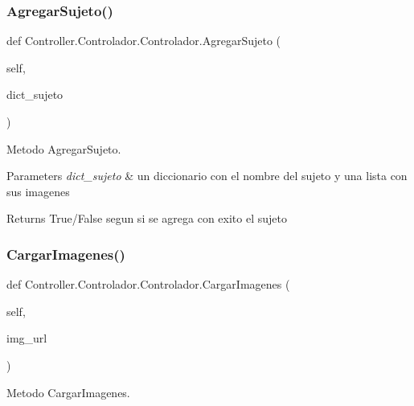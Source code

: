 \subsubsection{\texorpdfstring{Agregar\+Sujeto()}{AgregarSujeto()}}
{\footnotesize\ttfamily def Controller.\+Controlador.\+Controlador.\+Agregar\+Sujeto (\begin{DoxyParamCaption}\item[{}]{self,  }\item[{}]{dict\+\_\+sujeto }\end{DoxyParamCaption})}



Metodo Agregar\+Sujeto. 


\begin{DoxyParams}{Parameters}
{\em dict\+\_\+sujeto} & un diccionario con el nombre del sujeto y una lista con sus imagenes \\
\hline
\end{DoxyParams}
\begin{DoxyReturn}{Returns}
True/\+False segun si se agrega con exito el sujeto 
\end{DoxyReturn}
\mbox{\label{class_controller_1_1_controlador_1_1_controlador_a3284b7c2a5b4cb0f5e38231c6b0fb4b8}} 
\subsubsection{\texorpdfstring{Cargar\+Imagenes()}{CargarImagenes()}}
{\footnotesize\ttfamily def Controller.\+Controlador.\+Controlador.\+Cargar\+Imagenes (\begin{DoxyParamCaption}\item[{}]{self,  }\item[{}]{img\+\_\+url }\end{DoxyParamCaption})}



Metodo Cargar\+Imagenes. 


